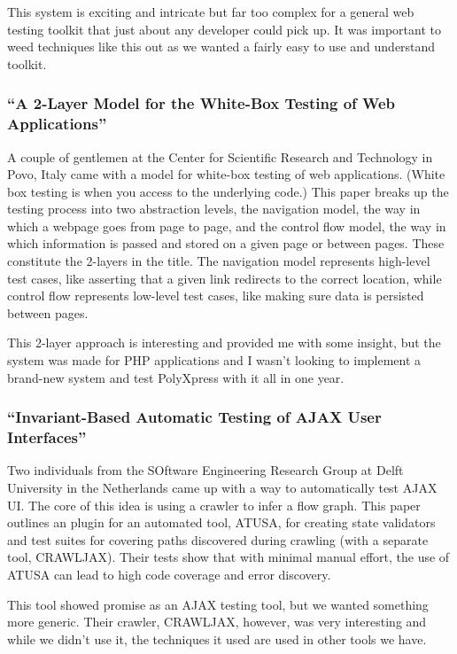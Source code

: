 \documentclass[11pt]{article}
\begin{document}
This system is exciting and intricate but far too complex for a general web testing toolkit that just about any developer could pick up. It was important to weed techniques like this out as we wanted a fairly easy to use and understand toolkit.

\subsubsection{``A 2-Layer Model for the White-Box Testing of Web Applications'' \cite{2LayerModel}}
A couple of gentlemen at the Center for Scientific Research and Technology in Povo, Italy came with a model for white-box testing of web applications. (White box testing is when you access to the underlying code.) This paper breaks up the testing process into two abstraction levels, the navigation model, the way in which a webpage goes from page to page, and the control flow model, the way in which information is passed and stored on a given page or between pages. These constitute the 2-layers in the title. The navigation model represents high-level test cases, like asserting that a given link redirects to the correct location, while control flow represents low-level test cases, like making sure data is persisted between pages. 

This 2-layer approach is interesting and provided me with some insight, but the system was made for PHP applications and I wasn't looking to implement a brand-new system and test PolyXpress with it all in one year.

\subsubsection{``Invariant-Based Automatic Testing of AJAX User Interfaces'' \cite{InvariantBasedUseInterfaces}}
Two individuals from the SOftware Engineering Research Group at Delft University in the Netherlands came up with a way to automatically test AJAX UI. The core of this idea is using a crawler to infer a flow graph. This paper outlines an plugin for an automated tool, ATUSA, for creating state validators and test suites for covering paths discovered during crawling (with a separate tool, CRAWLJAX). Their tests show that with minimal manual effort, the use of ATUSA can lead to high code coverage and error discovery. 

This tool showed promise as an AJAX testing tool, but we wanted something more generic. Their crawler, CRAWLJAX, however, was very interesting and while we didn't use it, the techniques it used are used in other tools we have.
\end{document}
